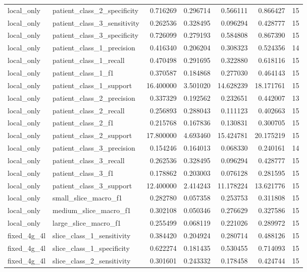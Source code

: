 \begin{tabular}{llrrrrr}
local_only & patient_class_2_specificity & 0.716269 & 0.296714 & 0.566111 & 0.866427 & 15 \\
local_only & patient_class_3_sensitivity & 0.262536 & 0.328495 & 0.096294 & 0.428777 & 15 \\
local_only & patient_class_3_specificity & 0.726099 & 0.279193 & 0.584808 & 0.867390 & 15 \\
local_only & patient_class_1_precision & 0.416340 & 0.206204 & 0.308323 & 0.524356 & 14 \\
local_only & patient_class_1_recall & 0.470498 & 0.291695 & 0.322880 & 0.618116 & 15 \\
local_only & patient_class_1_f1 & 0.370587 & 0.184868 & 0.277030 & 0.464143 & 15 \\
local_only & patient_class_1_support & 16.400000 & 3.501020 & 14.628239 & 18.171761 & 15 \\
local_only & patient_class_2_precision & 0.337329 & 0.192562 & 0.232651 & 0.442007 & 13 \\
local_only & patient_class_2_recall & 0.256893 & 0.288043 & 0.111123 & 0.402663 & 15 \\
local_only & patient_class_2_f1 & 0.215768 & 0.167836 & 0.130831 & 0.300705 & 15 \\
local_only & patient_class_2_support & 17.800000 & 4.693460 & 15.424781 & 20.175219 & 15 \\
local_only & patient_class_3_precision & 0.154246 & 0.164013 & 0.068330 & 0.240161 & 14 \\
local_only & patient_class_3_recall & 0.262536 & 0.328495 & 0.096294 & 0.428777 & 15 \\
local_only & patient_class_3_f1 & 0.178862 & 0.203003 & 0.076128 & 0.281595 & 15 \\
local_only & patient_class_3_support & 12.400000 & 2.414243 & 11.178224 & 13.621776 & 15 \\
local_only & small_slice_macro_f1 & 0.282780 & 0.057358 & 0.253753 & 0.311808 & 15 \\
local_only & medium_slice_macro_f1 & 0.302108 & 0.050346 & 0.276629 & 0.327586 & 15 \\
local_only & large_slice_macro_f1 & 0.255499 & 0.068119 & 0.221026 & 0.289972 & 15 \\
fixed_4g_4l & slice_class_1_sensitivity & 0.384420 & 0.204924 & 0.280714 & 0.488126 & 15 \\
fixed_4g_4l & slice_class_1_specificity & 0.622274 & 0.181435 & 0.530455 & 0.714093 & 15 \\
fixed_4g_4l & slice_class_2_sensitivity & 0.301601 & 0.243332 & 0.178458 & 0.424744 & 15 \\

\end{tabular}
